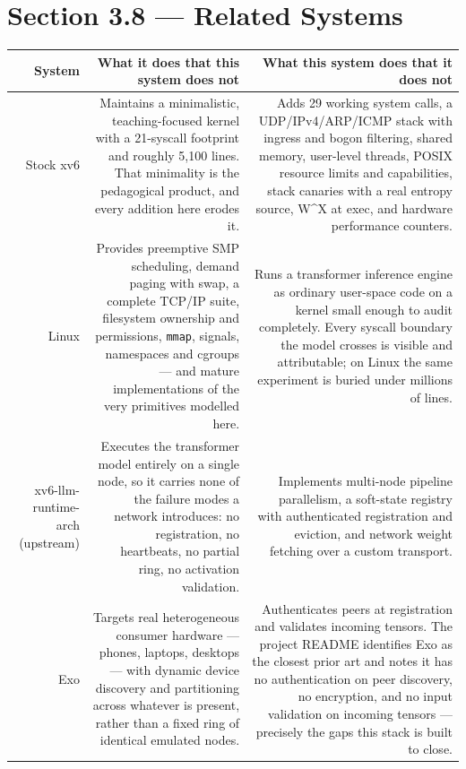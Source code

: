 \documentclass[11pt]{article}
\renewcommand{\_}{\origunderscore\allowbreak}
\begin{document}
\section*{Section 3.8 --- Related Systems}

\begingroup\small
\begin{longtable}{@{}R{0.18}R{0.41}R{0.41}@{}}
\toprule
\textbf{System} & \textbf{What it does that this system does not} & \textbf{What this system does that it does not} \\
\midrule
\endhead
Stock xv6 &
Maintains a minimalistic, teaching-focused kernel with a 21-syscall footprint and roughly 5,100 lines. That minimality is the pedagogical product, and every addition here erodes it. &
Adds 29 working system calls, a UDP/IPv4/ARP/ICMP stack with ingress and bogon filtering, shared memory, user-level threads, POSIX resource limits and capabilities, stack canaries with a real entropy source, W\^{}X at exec, and hardware performance counters. \\
\midrule
Linux &
Provides preemptive SMP scheduling, demand paging with swap, a complete TCP/IP suite, filesystem ownership and permissions, \texttt{mmap}, signals, namespaces and cgroups --- and mature implementations of the very primitives modelled here. &
Runs a transformer inference engine as ordinary user-space code on a kernel small enough to audit completely. Every syscall boundary the model crosses is visible and attributable; on Linux the same experiment is buried under millions of lines. \\
\midrule
xv6-llm-runtime-arch (upstream) &
Executes the transformer model entirely on a single node, so it carries none of the failure modes a network introduces: no registration, no heartbeats, no partial ring, no activation validation. &
Implements multi-node pipeline parallelism, a soft-state registry with authenticated registration and eviction, and network weight fetching over a custom transport. \\
\midrule
Exo &
Targets real heterogeneous consumer hardware --- phones, laptops, desktops --- with dynamic device discovery and partitioning across whatever is present, rather than a fixed ring of identical emulated nodes. &
Authenticates peers at registration and validates incoming tensors. The project README identifies Exo as the closest prior art and notes it has no authentication on peer discovery, no encryption, and no input validation on incoming tensors --- precisely the gaps this stack is built to close. \\

\end{longtable}
\end{document}
